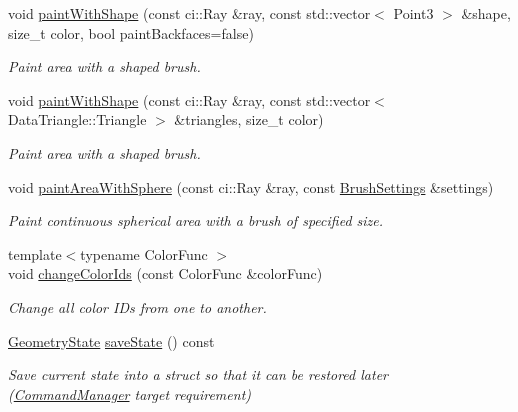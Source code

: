 \begin{DoxyCompactItemize}
void \mbox{\hyperlink{classpepr3d_1_1_geometry_a6c6b8ef6f157f8bb818e38f6e2e49b37}{paint\+With\+Shape}} (const ci\+::\+Ray \&ray, const std\+::vector$<$ Point3 $>$ \&shape, size\+\_\+t color, bool paint\+Backfaces=false)
\begin{DoxyCompactList}\small\item\em Paint area with a shaped brush. \end{DoxyCompactList}\item 
void \mbox{\hyperlink{classpepr3d_1_1_geometry_a152673dacbe299a55ee9dc6a2403d6a5}{paint\+With\+Shape}} (const ci\+::\+Ray \&ray, const std\+::vector$<$ Data\+Triangle\+::\+Triangle $>$ \&triangles, size\+\_\+t color)
\begin{DoxyCompactList}\small\item\em Paint area with a shaped brush. \end{DoxyCompactList}\item 
\mbox{\label{classpepr3d_1_1_geometry_ab4593a2aa8017add96d6cd7e177a0cf1}} 
void \mbox{\hyperlink{classpepr3d_1_1_geometry_ab4593a2aa8017add96d6cd7e177a0cf1}{paint\+Area\+With\+Sphere}} (const ci\+::\+Ray \&ray, const \mbox{\hyperlink{structpepr3d_1_1_brush_settings}{Brush\+Settings}} \&settings)
\begin{DoxyCompactList}\small\item\em Paint continuous spherical area with a brush of specified size. \end{DoxyCompactList}\item 
{\footnotesize template$<$typename Color\+Func $>$ }\\void \mbox{\hyperlink{classpepr3d_1_1_geometry_ae6d2ae86fca37592a5dbb93784ca4ef0}{change\+Color\+Ids}} (const Color\+Func \&color\+Func)
\begin{DoxyCompactList}\small\item\em Change all color ID\textquotesingle{}s from one to another. \end{DoxyCompactList}\item 
\mbox{\label{classpepr3d_1_1_geometry_a80198ecc7f17d1db360ab2bf50b7f594}} 
\mbox{\hyperlink{structpepr3d_1_1_geometry_1_1_geometry_state}{Geometry\+State}} \mbox{\hyperlink{classpepr3d_1_1_geometry_a80198ecc7f17d1db360ab2bf50b7f594}{save\+State}} () const
\begin{DoxyCompactList}\small\item\em Save current state into a struct so that it can be restored later (\mbox{\hyperlink{classpepr3d_1_1_command_manager}{Command\+Manager}} target requirement) \end{DoxyCompactList}\item 

\end{DoxyCompactItemize}
